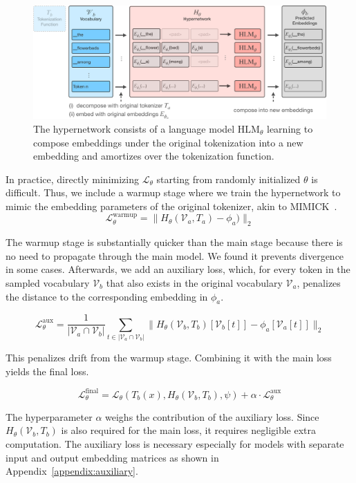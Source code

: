 \documentclass{article}
\begin{document}
\begin{figure}
    \centering
\includegraphics[width=0.82\linewidth]{figures/architecture-cropped.pdf}
    \caption{The hypernetwork consists of a language model $\mathrm{HLM}_\theta$ learning to compose embeddings under the original tokenization into a new embedding and amortizes over the tokenization function.}
    \label{fig:architecture}
    \vspace*{-0.2cm}
\end{figure}

 In practice, directly minimizing $\mathcal{L}_\theta$ starting from randomly initialized $\theta$ is difficult. Thus, we include a warmup stage where we train the hypernetwork to mimic the embedding parameters of the original tokenizer, akin to MIMICK~\citep{pinter2017mimicking}.
\[
\mathcal{L}^{\text{warmup}}_\theta = \|H_\theta(\mathcal{V}_a, T_a) - \phi_a)\|_2
\]

The warmup stage is substantially quicker than the main stage because there is no need to propagate through the main model. We found it prevents divergence in some cases. Afterwards, we add an auxiliary loss, which, for every token in the sampled vocabulary $\mathcal{V}_b$ that also exists in the original vocabulary $\mathcal{V}_a$, penalizes the distance to the corresponding embedding in $\phi_a$.

\[
\mathcal{L}^{\text{aux}}_\theta = \frac{1}{|\mathcal{V}_a \cap \mathcal{V}_b|}\sum_{t \in |\mathcal{V}_a \cap \mathcal{V}_b|}\|H_\theta(\mathcal{V}_b, T_b)[\mathcal{V}_b[t]] - \phi_a[\mathcal{V}_a[t]]\|_2
\]

This penalizes drift from the warmup stage. Combining it with the main loss yields the final loss.

\[
\mathcal{L}^{\text{final}}_{\theta} = 
\mathcal{L}_{\theta}(
T_b(x),
H_{\theta}(\mathcal{V}_b, T_b),
\psi
) + \alpha \cdot  \mathcal{L}^{\text{aux}}_\theta
\]

The hyperparameter $\alpha$ weighs the contribution of the auxiliary loss. Since $H_\theta(\mathcal{V}_b, T_b)$ is also required for the main loss, it requires negligible extra computation. The auxiliary loss is necessary especially for models with separate input and output embedding matrices as shown in Appendix~\ref{appendix:auxiliary}.
\end{document}
